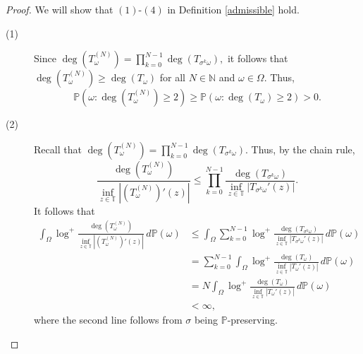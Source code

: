 \documentclass[10pt,a4paper]{amsart}
\begin{document}
\begin{proof} We will show that $(1)$-$(4)$ in Definition \ref{admissible} hold.
\begin{description}
    \item[(1)] Since $\deg(T_{\omega}^{(N)})=\prod_{k=0}^{N-1}\deg(T_{\sigma^{k}\omega}),$ it follows that $\deg(T_{\omega}^{(N)})\ge\deg(T_{\omega})$ for all $N\in\mathbb{N}$ and $\omega\in\Omega.$ Thus, $$\mathbb{P}(\omega:\deg(T_{\omega}^{(N)})\ge2)\ge\mathbb{P}(\omega:\deg(T_{\omega})\ge2)>0.$$

    \item[(2)]
    Recall that $\deg(T_{\omega}^{(N)})=\prod_{k=0}^{N-1}\deg(T_{\sigma^{k}\omega}).$ Thus, by the chain rule, $$\frac{\deg(T_{\omega}^{(N)})}{\inf_{z\in\mathbb{T}}|(T_{\omega}^{(N)})'(z)|}\le\prod_{k=0}^{N-1}\frac{\deg(T_{\sigma^{k}\omega})}{\inf_{z\in\mathbb{T}}|T_{\sigma^{k}\omega}'(z)|}.$$ It follows that \begin{align*}
    \int_{\Omega}\log^{+}\frac{\deg(T_{\omega}^{(N)})}{\inf_{z\in\mathbb{T}}|(T_{\omega}^{(N)})'(z)|}\,d\mathbb{P}(\omega)&\le\int_{\Omega}\sum_{k=0}^{N-1}\log^{+}\frac{\deg(T_{\sigma^{k}\omega})}{\inf_{z\in\mathbb{T}}|T_{\sigma^{k}\omega}'(z)|}\,d\mathbb{P}(\omega)\\&=\sum_{k=0}^{N-1}\int_{\Omega}\log^{+}\frac{\deg(T_{\omega})}{\inf_{z\in\mathbb{T}}|T_{\omega}'(z)|}\,d\mathbb{P}(\omega)\\&=N\int_{\Omega}\log^{+}\frac{\deg(T_{\omega})}{\inf_{z\in\mathbb{T}}|T_{\omega}'(z)|}\,d\mathbb{P}(\omega)\\&<\infty,
    \end{align*} where the second line follows from $\sigma$ being $\mathbb{P}$-preserving.


\end{description}
\end{proof}
\end{document}
